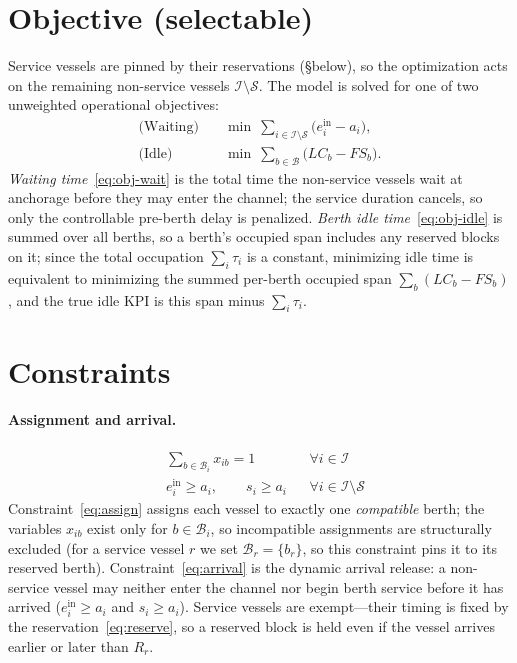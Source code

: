 \documentclass[11pt]{article}
\newcommand{\I}{\mathcal{I}}
\newcommand{\B}{\mathcal{B}}
\newcommand{\Svc}{\mathcal{S}}
\newcommand{\Bi}{\mathcal{B}_i}
\newcommand{\ein}{e^{\mathrm{in}}}
\begin{document}
\section{Objective (selectable)}
Service vessels are pinned by their reservations (\S below), so the optimization
acts on the remaining non-service vessels $\I\setminus\Svc$. The model is solved
for one of two unweighted operational objectives:
\begin{align}
\text{(Waiting)} \quad & \min\ \sum_{i\in\I\setminus\Svc}\bigl(\ein_i - a_i\bigr),
   \label{eq:obj-wait}\\[2pt]
\text{(Idle)} \quad & \min\ \sum_{b\in\B}\bigl(\mathit{LC}_b - \mathit{FS}_b\bigr).
   \label{eq:obj-idle}
\end{align}
\emph{Waiting time}~\eqref{eq:obj-wait} is the total time the non-service vessels
wait at anchorage before they may enter the channel; the service duration
cancels, so only the controllable pre-berth delay is penalized. \emph{Berth idle
time}~\eqref{eq:obj-idle} is summed over all berths, so a berth's occupied span
includes any reserved blocks on it; since the total occupation $\sum_i\tau_i$ is
a constant, minimizing idle time is equivalent to minimizing the summed
per-berth occupied span $\sum_b(\mathit{LC}_b-\mathit{FS}_b)$, and the true idle
KPI is this span minus $\sum_i\tau_i$.

\section{Constraints}
\paragraph{Assignment and arrival.}
\begin{align}
& \sum_{b\in\Bi} x_{ib} = 1 && \forall i\in\I \label{eq:assign}\\
& \ein_i \ge a_i,\qquad s_i \ge a_i && \forall i\in\I\setminus\Svc \label{eq:arrival}
\end{align}
Constraint~\eqref{eq:assign} assigns each vessel to exactly one \emph{compatible}
berth; the variables $x_{ib}$ exist only for $b\in\Bi$, so incompatible
assignments are structurally excluded (for a service vessel $r$ we set
$\mathcal{B}_r=\{b_r\}$, so this constraint pins it to its reserved berth).
Constraint~\eqref{eq:arrival} is the dynamic arrival release: a non-service
vessel may neither enter the channel nor begin berth service before it has
arrived ($\ein_i\ge a_i$ and $s_i\ge a_i$). Service vessels are exempt---their
timing is fixed by the reservation~\eqref{eq:reserve}, so a reserved block is
held even if the vessel arrives earlier or later than $R_r$.
\end{document}
